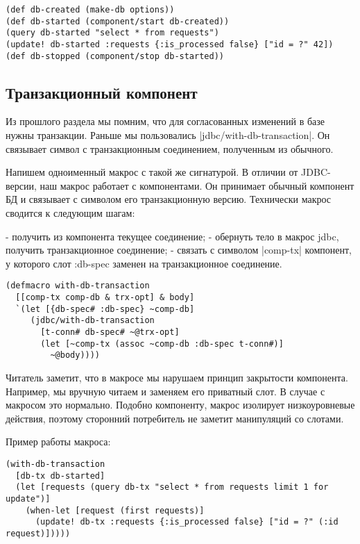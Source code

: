 \begin{verbatim}
(def db-created (make-db options))
(def db-started (component/start db-created))
(query db-started "select * from requests")
(update! db-started :requests {:is_processed false} ["id = ?" 42])
(def db-stopped (component/stop db-started))
\end{verbatim}

\subsection{Транзакционный компонент}

Из прошлого раздела мы помним, что для согласованных изменений в базе нужны
транзакции. Раньше мы пользовались \spverb|jdbc/with-db-transaction|. Он связывает
символ с транзакционным соединением, полученным из обычного.

Напишем одноименный макрос с такой же сигнатурой. В отличии от JDBC-версии, наш
макрос работает с компонентами. Он принимает обычный компонент БД и связывает с
символом его транзакционную версию. Технически макрос сводится к следующим
шагам:

- получить из компонента текущее соединение;
- обернуть тело в макрос jdbc, получить транзакционное соединение;
- связать с символом \spverb|comp-tx| компонент, у которого слот :db-spec заменен на
  транзакционное соединение.

\begin{verbatim}
(defmacro with-db-transaction
  [[comp-tx comp-db & trx-opt] & body]
  `(let [{db-spec# :db-spec} ~comp-db]
     (jdbc/with-db-transaction
       [t-conn# db-spec# ~@trx-opt]
       (let [~comp-tx (assoc ~comp-db :db-spec t-conn#)]
         ~@body))))
\end{verbatim}

Читатель заметит, что в макросе мы нарушаем принцип закрытости
компонента. Например, мы вручную читаем и заменяем его приватный слот. В случае
с макросом это нормально. Подобно компоненту, макрос изолирует низкоуровневые
действия, поэтому сторонний потребитель не заметит манипуляций со слотами.

Пример работы макроса:

\begin{verbatim}
(with-db-transaction
  [db-tx db-started]
  (let [requests (query db-tx "select * from requests limit 1 for update")]
    (when-let [request (first requests)]
      (update! db-tx :requests {:is_processed false} ["id = ?" (:id request)]))))
\end{verbatim}

